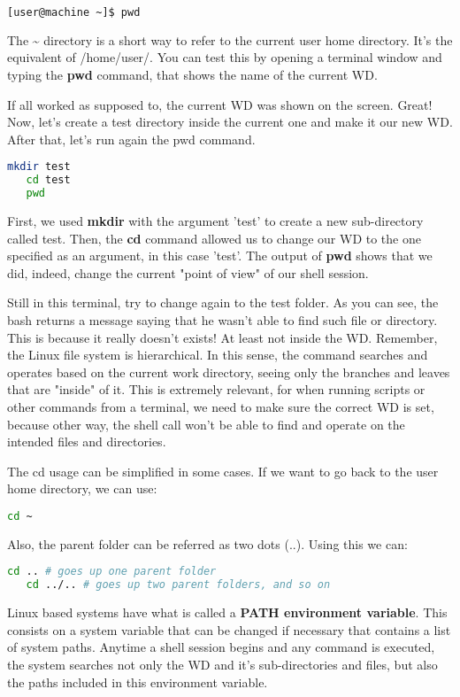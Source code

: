 \documentclass[a4paper,11pt]{article}
\begin{document}
\begin{lstlisting}[language=bash]
   [user@machine ~]$ pwd
\end{lstlisting}
\begin{remarkbox}
    The \textasciitilde {} directory is a short way to refer to the current
    user home directory. It's the equivalent of /home/user/. You can test this
    by opening a terminal window and typing the \textbf{pwd} command, that shows
    the name of the current WD.
\end{remarkbox}
If all worked as supposed to, the current WD was shown on the screen. Great!
Now, let's create a test directory inside the current one and make it our new
WD. After that, let's run again the pwd command.
\begin{lstlisting}[language=bash]
   mkdir test
   cd test
   pwd
\end{lstlisting}
First, we used \textbf{mkdir} with the argument 'test' to create a new
sub-directory called test. Then, the \textbf{cd} command allowed us to change
our WD to the one specified as an argument, in this case 'test'. The output of
\textbf{pwd} shows that we did, indeed, change the current "point of view" of
our shell session.\par
Still in this terminal, try to change again to the test folder. As you can see,
the bash returns a message saying that he wasn't able to find such file or
directory. This is because it really doesn't exists! At least not inside the WD.
Remember, the Linux file system is hierarchical. In this sense, the command
searches and operates based on the current work directory, seeing only the
branches and leaves that are "inside" of it. This is extremely relevant, for
when running scripts or other commands from a terminal, we need to make sure the
correct WD is set, because other way, the shell call won't be able to find and
operate on the intended files and directories.
\begin{tipbox}
    The cd usage can be simplified in some cases. If we want to go back to the
    user home directory, we can use:
\begin{lstlisting}[language=bash]
  cd ~ 
\end{lstlisting}
    Also, the parent folder can be referred as two dots (..). Using this we can:
\begin{lstlisting}[language=bash]
   cd .. # goes up one parent folder
   cd ../.. # goes up two parent folders, and so on 
\end{lstlisting}
\end{tipbox}
\begin{remarkbox}
    Linux based systems have what is called a \textbf{PATH environment
    variable}. This consists on a system variable that can be changed if
    necessary that contains a list of system paths. Anytime a shell session
    begins and any command is executed, the system searches not only the  WD
    and it's sub-directories and files, but also the paths included in this
    environment variable.
\end{remarkbox}
\end{document}
